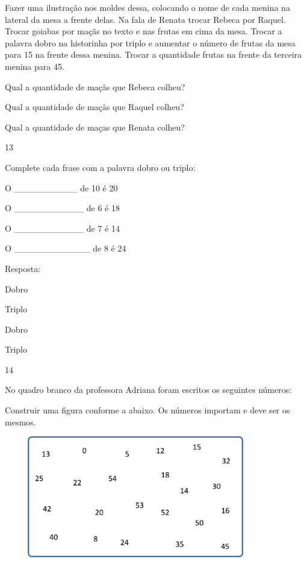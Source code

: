 Fazer uma ilustração nos moldes dessa, colocando o nome de cada menina
na lateral da mesa a frente delas. Na fala de Renata trocar Rebeca por
Raquel. Trocar goiabas por maçãs no texto e nas frutas em cima da mesa.
Trocar a palavra dobro na historinha por triplo e aumentar o número de
frutas da mesa para 15 na frente dessa menina. Trocar a quantidade
frutas na frente da terceira menina para 45.

\begin{escolha}

\item
  Qual a quantidade de maçãs que Rebeca colheu?

\item
  Qual a quantidade de maçãs que Raquel colheu?

\item
  Qual a quantidade de maças que Renata colheu?
\end{escolha}

\num{13}

Complete cada frase com a palavra dobro ou triplo:

\begin{escolha}

\item
  O \_\_\_\_\_\_\_\_\_\_ de 10 é 20
\item
  O \_\_\_\_\_\_\_\_\_\_\_ de 6 é 18
\item
  O \_\_\_\_\_\_\_\_\_\_\_ de 7 é 14
\item
  O \_\_\_\_\_\_\_\_\_\_\_\_ de 8 é 24
\end{escolha}

Resposta:

\begin{escolha}

\item
  Dobro
\item
  Triplo
\item
  Dobro
\item
  Triplo
\end{escolha}

\num{14}

No quadro branco da professora Adriana foram escritos os seguintes
números:

Construir uma figura conforme a abaixo. Os números importam e deve ser
os mesmos.

\includegraphics[width=4.51706in,height=2.09185in]{media/image25.png}

